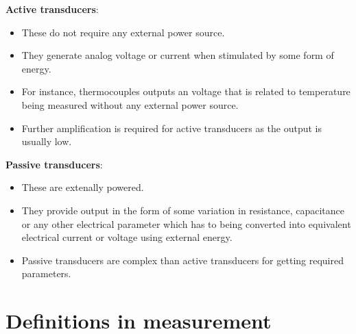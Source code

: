 \documentclass{article}
\begin{document}
\begin{itemize}
		\textbf{Active transducers}: 
		\begin{itemize}
			\item These do not require any external power source. 
			\item They generate analog voltage or current when stimulated by some form of energy. 
			\item For instance, thermocouples outputs an voltage that is related to temperature being measured without any external power source. 
			\item Further amplification is required for active transducers as the output is usually low.
		\end{itemize}
		\textbf{Passive transducers}:
		\begin{itemize}
			\item These are extenally powered.
			\item They provide output in the form of some variation in resistance, capacitance or any other electrical parameter which has to being converted into equivalent electrical current or voltage using external energy. 
			\item Passive transducers are complex than active transducers for getting required parameters. 
		\end{itemize}

	\end{itemize}

\section{Definitions in measurement}
\end{document}
